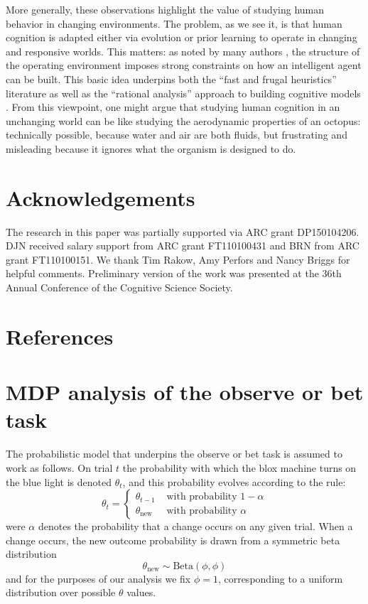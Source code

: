 \documentclass[authoryear]{elsarticle}
\begin{document}
More generally, these observations highlight the value of studying human behavior in changing environments. The problem, as we see it, is that human cognition is adapted either via evolution or prior learning to operate in changing and responsive worlds. This matters: as noted by many authors \citep[e.g.,][]{jordan_computational_1999}, the structure of the operating environment imposes strong constraints on how an intelligent agent can be built.  This basic idea underpins both the ``fast and frugal heuristics'' literature \citep[e.g.,][]{simon_rational_1956,gigerenzer_homo_2009} as well as the ``rational  analysis'' approach to building cognitive models \citep[e.g.,][]{anderson_adaptive_1990}. From this viewpoint, one might argue that studying human cognition in an unchanging world can be like studying the aerodynamic properties of an octopus: technically possible, because water and air are both fluids, but frustrating and misleading  because it ignores what the organism is designed to do.


\section{Acknowledgements}

The research in this paper was partially supported via ARC grant DP150104206. DJN received salary support from ARC grant FT110100431 and BRN from ARC grant FT110100151. We thank Tim Rakow, Amy Perfors and Nancy Briggs for helpful comments. Preliminary version of the work was presented at the 36th Annual Conference of the Cognitive Science Society.

\section{References}





%


\appendix

\section{MDP analysis of the observe or bet task}

The probabilistic model that underpins the observe or bet task is assumed to work as follows. On trial $t$ the probability with which the blox machine turns on the blue light is denoted $\theta_t$, and this probability evolves according to the rule:
$$
\theta_t =  \left\{ \begin{array}{ll} \theta_{t-1} & \mbox{ with probability } 1-\alpha \\ \theta_{\mbox{new}} & \mbox{ with probability } \alpha \end{array} \right.
$$
were $\alpha$ denotes the probability that a change occurs on any given trial. When a change occurs, the new outcome probability is drawn from a symmetric beta distribution
$$
\theta_{\mbox{new}} \sim \mbox{Beta}(\phi,\phi)
$$
and for the purposes of our analysis we fix $\phi=1$, corresponding to a uniform distribution over possible $\theta$ values.
\end{document}
